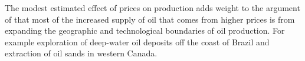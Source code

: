 \documentclass[12pt]{article}
\begin{document}
The modest estimated effect of prices on production adds weight to the argument of \citet{hamilton_oil_2012} that most of the increased supply of oil that comes from higher prices is from expanding the geographic and technological boundaries of oil production.  For example exploration of deep-water oil deposits off the coast of Brazil and extraction of oil sands in western Canada.   





\FloatBarrier

\appendix
\end{document}
